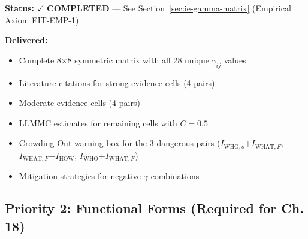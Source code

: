 \begin{tcolorbox}[colback=green!5!white, colframe=green!75!black,
    title=\textbf{TODO-UNMAPPED_IE-3: Intervention Complementarity Matrix $\gamma_{ij}$ --- COMPLETED}]

\textbf{Status:} $\checkmark$ \textbf{COMPLETED} --- See Section~\ref{sec:ie-gamma-matrix} (Empirical Axiom EIT-EMP-1)

\textbf{Delivered:}
\begin{itemize}[nosep]
    \item Complete 8$\times$8 symmetric matrix with all 28 unique $\gamma_{ij}$ values
    \item Literature citations for strong evidence cells (4 pairs)
    \item Moderate evidence cells (4 pairs)
    \item LLMMC estimates for remaining cells with $C = 0.5$
    \item Crowding-Out warning box for the 3 dangerous pairs ($I_{\text{WHO},o}$+$I_{\text{WHAT},F}$, $I_{\text{WHAT},F}$+$I_{\text{HOW}}$, $I_{\text{WHO}}$+$I_{\text{WHAT},F}$)
    \item Mitigation strategies for negative $\gamma$ combinations
\end{itemize}

\end{tcolorbox}

\subsection{Priority 2: Functional Forms (Required for Ch. 18)}

